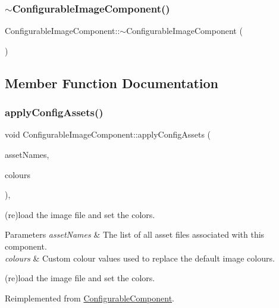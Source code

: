 \subsubsection{\texorpdfstring{$\sim$\+Configurable\+Image\+Component()}{~ConfigurableImageComponent()}}
{\footnotesize\ttfamily Configurable\+Image\+Component\+::$\sim$\+Configurable\+Image\+Component (\begin{DoxyParamCaption}{ }\end{DoxyParamCaption})\hspace{0.3cm}{\ttfamily [inline]}}



\subsection{Member Function Documentation}
\mbox{\label{classConfigurableImageComponent_ad7670a14df8fd20780f91d85db2ec542}} 
\subsubsection{\texorpdfstring{apply\+Config\+Assets()}{applyConfigAssets()}}
{\footnotesize\ttfamily void Configurable\+Image\+Component\+::apply\+Config\+Assets (\begin{DoxyParamCaption}\item[{String\+Array}]{asset\+Names,  }\item[{Array$<$ Colour $>$}]{colours }\end{DoxyParamCaption})\hspace{0.3cm}{\ttfamily [protected]}, {\ttfamily [virtual]}}

(re)load the image file and set the colors.


\begin{DoxyParams}{Parameters}
{\em asset\+Names} & The list of all asset files associated with this component.\\
\hline
{\em colours} & Custom colour values used to replace the default image colours.\\
\hline
\end{DoxyParams}
(re)load the image file and set the colors. 

Reimplemented from \mbox{\hyperlink{classConfigurableComponent_a394fbc2f6a8b3dc9210464d3d6efa212}{Configurable\+Component}}.

